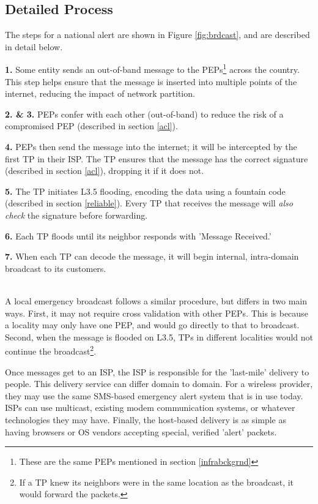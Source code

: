 \subsection{Detailed Process}
The steps for a national alert are shown in Figure \ref{fig:brdcast}, and are described in detail below.

\textbf{1.} Some entity sends an out-of-band message to the PEPs\footnote{These are the same PEPs mentioned in section \ref{infrabckgrnd}} across the country. This step helps ensure that the message is inserted into multiple points of the internet, reducing the impact of network partition. 

\textbf{2. \& 3.} PEPs confer with each other (out-of-band) to reduce the risk of a compromised PEP (described in section \ref{acl}). 

\textbf{4.} PEPs then send the message into the internet; it will be intercepted by the first TP in their ISP. The TP ensures that the message has the correct signature (described in section \ref{acl}), dropping it if it does not.

\textbf{5.} The TP initiates L3.5 flooding, encoding the data using a fountain code (described in section \ref{reliable}). Every TP that receives the message will \textit{also check} the signature before forwarding. 

\textbf{6.} Each TP floods until its neighbor responds with 'Message Received.' 

\textbf{7.} When each TP can decode the message, it will begin internal, intra-domain broadcast to its customers.

\\
A local emergency broadcast follows a similar procedure, but differs in two main ways. First, it may not require cross validation with other PEPs. This is because a locality may only have one PEP, and would go directly to that to broadcast. Second, when the message is flooded on L3.5, TPs in different localities would not continue the broadcast\footnote{If a TP knew its neighbors were in the same location as the broadcast, it would forward the packets.}. 

Once messages get to an ISP, the ISP is responsible for the 'last-mile' delivery to people. This delivery service can differ domain to domain. For a wireless provider, they may use the same SMS-based emergency alert system that is in use today. ISPs can use multicast, existing modem communication systems, or whatever technologies they may have. Finally, the host-based delivery is as simple as having browsers or OS vendors accepting special, verified 'alert' packets. 

